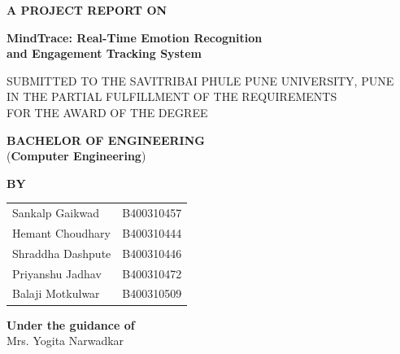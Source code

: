 \begin{titlepage}
\centering

\vspace*{0.2cm}

{\large \textbf{A PROJECT REPORT ON}}

\vspace{0.2cm}

{\Large \textbf{MindTrace: Real-Time Emotion Recognition\\[4pt]
and Engagement Tracking System}}

\vspace{0.2cm}

{\normalsize
SUBMITTED TO THE SAVITRIBAI PHULE PUNE UNIVERSITY, PUNE\\
IN THE PARTIAL FULFILLMENT OF THE REQUIREMENTS\\
FOR THE AWARD OF THE DEGREE
}

\vspace{0.25cm}

{\large \textbf{BACHELOR OF ENGINEERING}}\\[2pt]
{\normalsize (\textbf{Computer Engineering})}

\vspace{0.2cm}

{\large \textbf{BY}}

\vspace{0.2cm}

\begin{tabular}{ll}
  Sankalp Gaikwad & B400310457 \\[3pt]
  Hemant Choudhary & B400310444 \\[3pt]
  Shraddha Dashpute & B400310446 \\[3pt]
  Priyanshu Jadhav & B400310472 \\[3pt]
  Balaji Motkulwar & B400310509 \\[3pt]
  
\end{tabular}

\vspace{0.35cm}

{\normalsize \textbf{Under the guidance of}}\\[4pt]
{\normalsize Mrs. Yogita Narwadkar}


\end{titlepage}
